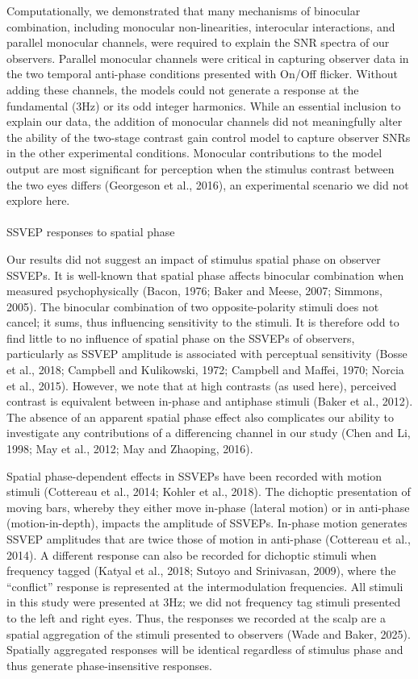 \documentclass[
  12pt,
]{article}
\makeatletter
\let\oldparagraph\paragraph
\renewcommand{\paragraph}{
    \@ifstar
      \xxxParagraphStar
      \xxxParagraphNoStar
  }
\newcommand{\xxxParagraphStar}[1]{\oldparagraph*{#1}\mbox{}}
\newcommand{\xxxParagraphNoStar}[1]{\oldparagraph{#1}\mbox{}}
\makeatother
\begin{document}
Computationally, we demonstrated that many mechanisms of binocular
combination, including monocular non-linearities, interocular
interactions, and parallel monocular channels, were required to explain
the SNR spectra of our observers. Parallel monocular channels were
critical in capturing observer data in the two temporal anti-phase
conditions presented with On/Off flicker. Without adding these channels,
the models could not generate a response at the fundamental (3Hz) or its
odd integer harmonics. While an essential inclusion to explain our data,
the addition of monocular channels did not meaningfully alter the
ability of the two-stage contrast gain control model to capture observer
SNRs in the other experimental conditions. Monocular contributions to
the model output are most significant for perception when the stimulus
contrast between the two eyes differs (Georgeson et al., 2016), an
experimental scenario we did not explore here.

\paragraph{SSVEP responses to spatial
phase}\label{ssvep-responses-to-spatial-phase}

Our results did not suggest an impact of stimulus spatial phase on
observer SSVEPs. It is well-known that spatial phase affects binocular
combination when measured psychophysically (Bacon, 1976; Baker and
Meese, 2007; Simmons, 2005). The binocular combination of two
opposite-polarity stimuli does not cancel; it sums, thus influencing
sensitivity to the stimuli. It is therefore odd to find little to no
influence of spatial phase on the SSVEPs of observers, particularly as
SSVEP amplitude is associated with perceptual sensitivity (Bosse et al.,
2018; Campbell and Kulikowski, 1972; Campbell and Maffei, 1970; Norcia
et al., 2015). However, we note that at high contrasts (as used here),
perceived contrast is equivalent between in-phase and antiphase stimuli
(Baker et al., 2012). The absence of an apparent spatial phase effect
also complicates our ability to investigate any contributions of a
differencing channel in our study (Chen and Li, 1998; May et al., 2012;
May and Zhaoping, 2016).

Spatial phase-dependent effects in SSVEPs have been recorded with motion
stimuli (Cottereau et al., 2014; Kohler et al., 2018). The dichoptic
presentation of moving bars, whereby they either move in-phase (lateral
motion) or in anti-phase (motion-in-depth), impacts the amplitude of
SSVEPs. In-phase motion generates SSVEP amplitudes that are twice those
of motion in anti-phase (Cottereau et al., 2014). A different response
can also be recorded for dichoptic stimuli when frequency tagged (Katyal
et al., 2018; Sutoyo and Srinivasan, 2009), where the ``conflict''
response is represented at the intermodulation frequencies. All stimuli
in this study were presented at 3Hz; we did not frequency tag stimuli
presented to the left and right eyes. Thus, the responses we recorded at
the scalp are a spatial aggregation of the stimuli presented to
observers (Wade and Baker, 2025). Spatially aggregated responses will be
identical regardless of stimulus phase and thus generate
phase-insensitive responses.
\end{document}
